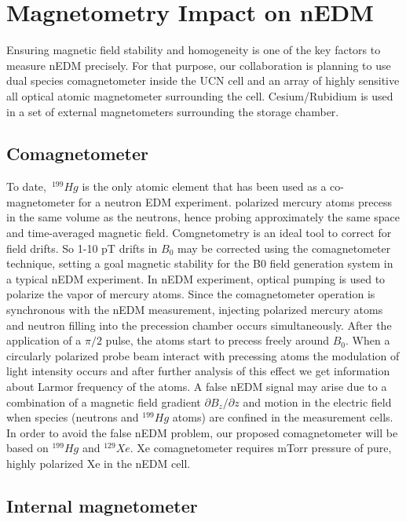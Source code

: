 \section{ Magnetometry Impact on nEDM}
Ensuring magnetic field stability and homogeneity is one of the key factors to measure nEDM precisely. For that purpose, our collaboration is planning to use dual species comagnetometer inside the UCN cell and an array of highly sensitive all optical atomic magnetometer surrounding the cell. Cesium/Rubidium is used in a set of external magnetometers surrounding the storage chamber.
\subsection{Comagnetometer}
To date,~$^{199}Hg$ is the only atomic element that has been used as a co-magnetometer for a neutron EDM experiment\cite{PhysRevLett.97.131801}\cite{PhysRevLett.102.101601}.  polarized mercury atoms precess in the same volume as the neutrons, hence probing approximately the same space and time-averaged magnetic field.  Comgnetometry is an ideal tool to correct for field drifts.  So 1-10 pT drifts in $B_0$  may be corrected using the comagnetometer technique, setting a goal magnetic stability for the B0  field generation system in a typical nEDM experiment\cite{PhysRevLett.97.131801}\cite{afach:in2p3-01062292}. In nEDM experiment, optical pumping is used to polarize the vapor of mercury atoms. Since the comagnetometer operation is synchronous with the nEDM measurement, injecting polarized mercury atoms and  neutron filling into the precession chamber occurs simultaneously. After the application of a $\pi/2$ pulse, the atoms start to precess freely around $B_0$. When a circularly polarized probe beam interact with precessing atoms the modulation of light intensity occurs and after further analysis of  this effect we get information about Larmor frequency of the atoms. A false nEDM signal may arise due to a combination of a magnetic field gradient $\partial B_{z}/{\partial  z}$ and motion in the electric field when species (neutrons and $^{199}Hg$ atoms) are confined in the measurement cells. In order to avoid the false nEDM problem, our proposed comagnetometer will be based on $^{199}Hg$ and $^{129}Xe$. Xe comagnetometer requires mTorr pressure of pure,
highly polarized Xe in the nEDM cell.
\subsection{Internal magnetometer}


